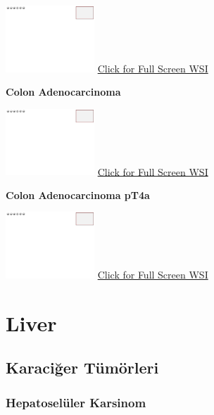 \documentclass[
  letterpaper,
  paper=6in:9in,
  pagesize=pdftex,
  headinclude=on,
  footinclude=on,
  12pt]{scrbook}
\begin{document}
\href{https://images.patolojiatlasi.com/template/HE.html}{\includegraphics[width=0.25\textwidth,height=\textheight]{./screenshots/template_screenshot.png}}
\href{https://images.patolojiatlasi.com/colon-adenocarcinoma/HE.html}{Click
for Full Screen WSI}

\textbf{Colon Adenocarcinoma}

\href{https://images.patolojiatlasi.com/template/HE.html}{\includegraphics[width=0.25\textwidth,height=\textheight]{./screenshots/template_screenshot.png}}
\href{https://images.patolojiatlasi.com/colon-adenocarcinoma/HE2.html}{Click
for Full Screen WSI}

\textbf{Colon Adenocarcinoma pT4a}

\href{https://images.patolojiatlasi.com/template/HE.html}{\includegraphics[width=0.25\textwidth,height=\textheight]{./screenshots/template_screenshot.png}}
\href{https://images.patolojiatlasi.com/colon-adenocarcinoma/HE3.html}{Click
for Full Screen WSI}

\part{Liver}

\hypertarget{sec-karaciger-tumorleri}{%
\chapter{Karaciğer Tümörleri}\label{sec-karaciger-tumorleri}}

\hypertarget{sec-hepatoseluler-karsinom}{%
\section{Hepatoselüler Karsinom}\label{sec-hepatoseluler-karsinom}}
\end{document}
